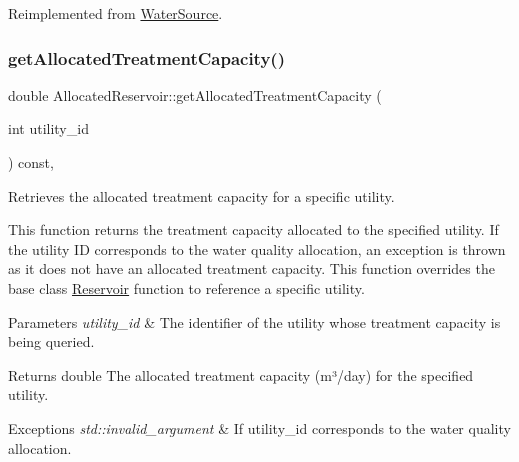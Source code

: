 Reimplemented from \mbox{\hyperlink{classWaterSource_acec9b1fef81a9b73c4517409438452ac}{Water\+Source}}.

\mbox{\label{classAllocatedReservoir_aba81b93e1aa1154ce411248903fabde6}} 
\subsubsection{\texorpdfstring{get\+Allocated\+Treatment\+Capacity()}{getAllocatedTreatmentCapacity()}}
{\footnotesize\ttfamily double Allocated\+Reservoir\+::get\+Allocated\+Treatment\+Capacity (\begin{DoxyParamCaption}\item[{int}]{utility\+\_\+id }\end{DoxyParamCaption}) const\hspace{0.3cm}{\ttfamily [override]}, {\ttfamily [virtual]}}



Retrieves the allocated treatment capacity for a specific utility. 

This function returns the treatment capacity allocated to the specified utility. If the utility ID corresponds to the water quality allocation, an exception is thrown as it does not have an allocated treatment capacity. This function overrides the base class {\ttfamily \mbox{\hyperlink{classReservoir}{Reservoir}}} function to reference a specific utility.


\begin{DoxyParams}{Parameters}
{\em utility\+\_\+id} & The identifier of the utility whose treatment capacity is being queried.\\
\hline
\end{DoxyParams}
\begin{DoxyReturn}{Returns}
double The allocated treatment capacity (m³/day) for the specified utility.
\end{DoxyReturn}

\begin{DoxyExceptions}{Exceptions}
{\em std\+::invalid\+\_\+argument} & If {\ttfamily utility\+\_\+id} corresponds to the water quality allocation. \\
\hline
\end{DoxyExceptions}


